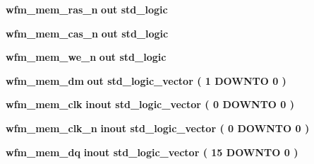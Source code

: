 \begin{DoxyCompactItemize}
\item 
{\bf wfm\+\_\+mem\+\_\+ras\+\_\+n}  {\bfseries {\bfseries \textcolor{keywordflow}{out}\textcolor{vhdlchar}{ }}} {\bfseries \textcolor{comment}{std\+\_\+logic}\textcolor{vhdlchar}{ }} 
\item 
{\bf wfm\+\_\+mem\+\_\+cas\+\_\+n}  {\bfseries {\bfseries \textcolor{keywordflow}{out}\textcolor{vhdlchar}{ }}} {\bfseries \textcolor{comment}{std\+\_\+logic}\textcolor{vhdlchar}{ }} 
\item 
{\bf wfm\+\_\+mem\+\_\+we\+\_\+n}  {\bfseries {\bfseries \textcolor{keywordflow}{out}\textcolor{vhdlchar}{ }}} {\bfseries \textcolor{comment}{std\+\_\+logic}\textcolor{vhdlchar}{ }} 
\item 
{\bf wfm\+\_\+mem\+\_\+dm}  {\bfseries {\bfseries \textcolor{keywordflow}{out}\textcolor{vhdlchar}{ }}} {\bfseries \textcolor{comment}{std\+\_\+logic\+\_\+vector}\textcolor{vhdlchar}{ }\textcolor{vhdlchar}{(}\textcolor{vhdlchar}{ }\textcolor{vhdlchar}{ } \textcolor{vhdldigit}{1} \textcolor{vhdlchar}{ }\textcolor{keywordflow}{D\+O\+W\+N\+TO}\textcolor{vhdlchar}{ }\textcolor{vhdlchar}{ } \textcolor{vhdldigit}{0} \textcolor{vhdlchar}{ }\textcolor{vhdlchar}{)}\textcolor{vhdlchar}{ }} 
\item 
{\bf wfm\+\_\+mem\+\_\+clk}  {\bfseries {\bfseries \textcolor{keywordflow}{inout}\textcolor{vhdlchar}{ }}} {\bfseries \textcolor{comment}{std\+\_\+logic\+\_\+vector}\textcolor{vhdlchar}{ }\textcolor{vhdlchar}{(}\textcolor{vhdlchar}{ }\textcolor{vhdlchar}{ } \textcolor{vhdldigit}{0} \textcolor{vhdlchar}{ }\textcolor{keywordflow}{D\+O\+W\+N\+TO}\textcolor{vhdlchar}{ }\textcolor{vhdlchar}{ } \textcolor{vhdldigit}{0} \textcolor{vhdlchar}{ }\textcolor{vhdlchar}{)}\textcolor{vhdlchar}{ }} 
\item 
{\bf wfm\+\_\+mem\+\_\+clk\+\_\+n}  {\bfseries {\bfseries \textcolor{keywordflow}{inout}\textcolor{vhdlchar}{ }}} {\bfseries \textcolor{comment}{std\+\_\+logic\+\_\+vector}\textcolor{vhdlchar}{ }\textcolor{vhdlchar}{(}\textcolor{vhdlchar}{ }\textcolor{vhdlchar}{ } \textcolor{vhdldigit}{0} \textcolor{vhdlchar}{ }\textcolor{keywordflow}{D\+O\+W\+N\+TO}\textcolor{vhdlchar}{ }\textcolor{vhdlchar}{ } \textcolor{vhdldigit}{0} \textcolor{vhdlchar}{ }\textcolor{vhdlchar}{)}\textcolor{vhdlchar}{ }} 
\item 
{\bf wfm\+\_\+mem\+\_\+dq}  {\bfseries {\bfseries \textcolor{keywordflow}{inout}\textcolor{vhdlchar}{ }}} {\bfseries \textcolor{comment}{std\+\_\+logic\+\_\+vector}\textcolor{vhdlchar}{ }\textcolor{vhdlchar}{(}\textcolor{vhdlchar}{ }\textcolor{vhdlchar}{ } \textcolor{vhdldigit}{15} \textcolor{vhdlchar}{ }\textcolor{keywordflow}{D\+O\+W\+N\+TO}\textcolor{vhdlchar}{ }\textcolor{vhdlchar}{ } \textcolor{vhdldigit}{0} \textcolor{vhdlchar}{ }\textcolor{vhdlchar}{)}\textcolor{vhdlchar}{ }} 

\end{DoxyCompactItemize}
